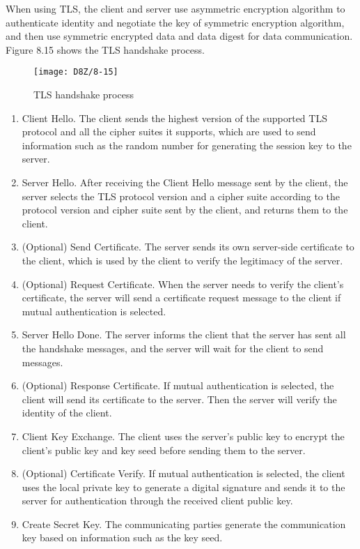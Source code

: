 \documentclass[a4paper,12pt]{book}
\begin{document}
When using TLS, the client and server use asymmetric encryption algorithm to authenticate identity and negotiate the key of symmetric encryption algorithm, and then use symmetric encrypted data and data digest for data communication. Figure 8.15 shows the TLS handshake process.

\begin{figure}[!h]
    \centering
    \texttt{[image: D8Z/8-15]}
    \caption{TLS handshake process}
\end{figure}

\begin{enumerate}[label=(\arabic*)]
    \item Client Hello. The client sends the highest version of the supported TLS protocol and all the cipher suites it supports, which are used to send information such as the random number for generating the session key to the server.
    \item Server Hello. After receiving the Client Hello message sent by the client, the server selects the TLS protocol version and a cipher suite according to the protocol version and cipher suite sent by the client, and returns them to the client.
    \item (Optional) Send Certificate. The server sends its own server-side certificate to the client, which is used by the client to verify the legitimacy of the server.
    \item (Optional) Request Certificate. When the server needs to verify the client’s certificate, the server will send a certificate request message to the client if mutual authentication is selected.
    \item Server Hello Done. The server informs the client that the server has sent all the handshake messages, and the server will wait for the client to send messages.
    \item (Optional) Response Certificate. If mutual authentication is selected, the client will send  its certificate to the server. Then the server will verify the identity of the client.
    \item Client Key Exchange. The client uses the server’s public key to encrypt the client’s public key and key seed before sending them to the server.
    \item (Optional) Certificate Verify. If mutual authentication is selected, the client uses the local private key to generate a digital signature and sends it to the server for authentication through the received client public key.
    \item Create Secret Key. The communicating parties generate the communication key based on information such as the key seed.

\end{enumerate}
\end{document}

